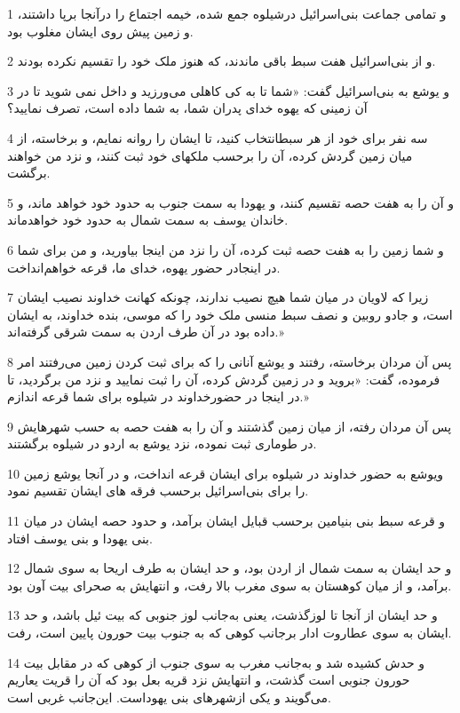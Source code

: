 \par 1 و تمامی جماعت بنی‌اسرائیل درشیلوه جمع شده، خیمه اجتماع را درآنجا برپا داشتند، و زمین پیش روی ایشان مغلوب بود.
\par 2 و از بنی‌اسرائیل هفت سبط باقی ماندند، که هنوز ملک خود را تقسیم نکرده بودند.
\par 3 و یوشع به بنی‌اسرائیل گفت: «شما تا به کی کاهلی می‌ورزید و داخل نمی شوید تا در آن زمینی که یهوه خدای پدران شما، به شما داده است، تصرف نمایید؟
\par 4 سه نفر برای خود از هر سبطانتخاب کنید، تا ایشان را روانه نمایم، و برخاسته، از میان زمین گردش کرده، آن را برحسب ملکهای خود ثبت کنند، و نزد من خواهند برگشت.
\par 5 و آن را به هفت حصه تقسیم کنند، و یهودا به سمت جنوب به حدود خود خواهد ماند، و خاندان یوسف به سمت شمال به حدود خود خواهدماند.
\par 6 و شما زمین را به هفت حصه ثبت کرده، آن را نزد من اینجا بیاورید، و من برای شما در اینجادر حضور یهوه، خدای ما، قرعه خواهم‌انداخت.
\par 7 زیرا که لاویان در میان شما هیچ نصیب ندارند، چونکه کهانت خداوند نصیب ایشان است، و جادو روبین و نصف سبط منسی ملک خود را که موسی، بنده خداوند، به ایشان داده بود در آن طرف اردن به سمت شرقی گرفته‌اند.»
\par 8 پس آن مردان برخاسته، رفتند و یوشع آنانی را که برای ثبت کردن زمین می‌رفتند امر فرموده، گفت: «بروید و در زمین گردش کرده، آن را ثبت نمایید و نزد من برگردید، تا در اینجا در حضورخداوند در شیلوه برای شما قرعه اندازم.»
\par 9 پس آن مردان رفته، از میان زمین گذشتند و آن را به هفت حصه به حسب شهرهایش در طوماری ثبت نموده، نزد یوشع به اردو در شیلوه برگشتند.
\par 10 ویوشع به حضور خداوند در شیلوه برای ایشان قرعه انداخت، و در آنجا یوشع زمین را برای بنی‌اسرائیل برحسب فرقه های ایشان تقسیم نمود.
\par 11 و قرعه سبط بنی بنیامین برحسب قبایل ایشان برآمد، و حدود حصه ایشان در میان بنی یهودا و بنی یوسف افتاد.
\par 12 و حد ایشان به سمت شمال از اردن بود، و حد ایشان به طرف اریحا به سوی شمال برآمد، و از میان کوهستان به سوی مغرب بالا رفت، و انتهایش به صحرای بیت آون بود.
\par 13 و حد ایشان از آنجا تا لوزگذشت، یعنی به‌جانب لوز جنوبی که بیت ئیل باشد، و حد ایشان به سوی عطاروت ادار برجانب کوهی که به جنوب بیت حورون پایین است، رفت.
\par 14 و حدش کشیده شد و به‌جانب مغرب به سوی جنوب از کوهی که در مقابل بیت حورون جنوبی است گذشت، و انتهایش نزد قریه بعل بود که آن را قریت یعاریم می‌گویند و یکی ازشهرهای بنی یهوداست. این‌جانب غربی است.
